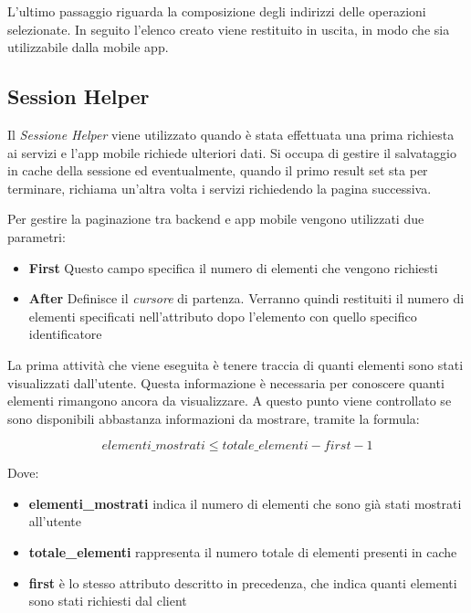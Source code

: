 L'ultimo passaggio riguarda la composizione degli indirizzi delle operazioni selezionate. In seguito l'elenco creato viene restituito in uscita, in modo che sia utilizzabile dalla mobile app.

\subsection{Session Helper\label{sec:session-helper}}

Il \emph{Sessione Helper} viene utilizzato quando è stata effettuata una prima richiesta ai servizi e l'app mobile richiede ulteriori dati. Si occupa di gestire il salvataggio in cache della sessione ed eventualmente, quando il primo result set sta per terminare, richiama un'altra volta i servizi richiedendo la pagina successiva.

Per gestire la paginazione tra backend e app mobile vengono utilizzati due parametri:

\begin{itemize}
	\item \textbf{First} Questo campo specifica il numero di elementi che vengono richiesti
	\item \textbf{After} Definisce il \emph{cursore} di partenza. Verranno quindi restituiti il numero di elementi specificati nell'attributo  dopo l'elemento con quello specifico identificatore
\end{itemize}

La prima attività che viene eseguita è tenere traccia di quanti elementi sono stati visualizzati dall'utente. Questa informazione è necessaria per conoscere quanti elementi rimangono ancora da visualizzare. A questo punto viene controllato se sono disponibili abbastanza informazioni da mostrare, tramite la formula:

\begin{equation}
	elementi\_mostrati \le totale\_elementi - first - 1
\end{equation}

Dove:

\begin{itemize}
	\item \textbf{elementi\_mostrati} indica il numero di elementi che sono già stati mostrati all'utente
	\item \textbf{totale\_elementi} rappresenta il numero totale di elementi presenti in cache
	\item \textbf{first} è lo stesso attributo descritto in precedenza, che indica quanti elementi sono stati richiesti dal client
\end{itemize}

